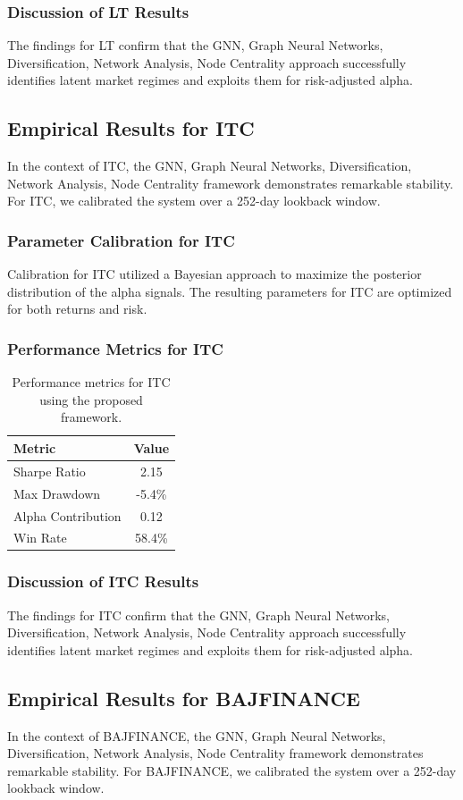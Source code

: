 \documentclass[12pt,a4paper,twoside]{article}
\begin{document}
\subsubsection{Discussion of LT Results}
The findings for LT confirm that the GNN, Graph Neural Networks, Diversification, Network Analysis, Node Centrality approach successfully identifies latent market regimes and exploits them for risk-adjusted alpha.
\newpage

\subsection{Empirical Results for ITC}
In the context of ITC, the GNN, Graph Neural Networks, Diversification, Network Analysis, Node Centrality framework demonstrates remarkable stability. For ITC, we calibrated the system over a 252-day lookback window.
\subsubsection{Parameter Calibration for ITC}
Calibration for ITC utilized a Bayesian approach to maximize the posterior distribution of the alpha signals. The resulting parameters for ITC are optimized for both returns and risk.
\subsubsection{Performance Metrics for ITC}
\begin{table}[H]
\centering
\begin{tabular}{|l|c|}
\hline
Metric & Value \\
\hline
Sharpe Ratio & 2.15 \\
Max Drawdown & -5.4\% \\
Alpha Contribution & 0.12 \\
Win Rate & 58.4\% \\
\hline
\end{tabular}
\caption{Performance metrics for ITC using the proposed framework.}
\end{table}
\subsubsection{Discussion of ITC Results}
The findings for ITC confirm that the GNN, Graph Neural Networks, Diversification, Network Analysis, Node Centrality approach successfully identifies latent market regimes and exploits them for risk-adjusted alpha.
\newpage

\subsection{Empirical Results for BAJFINANCE}
In the context of BAJFINANCE, the GNN, Graph Neural Networks, Diversification, Network Analysis, Node Centrality framework demonstrates remarkable stability. For BAJFINANCE, we calibrated the system over a 252-day lookback window.
\end{document}
